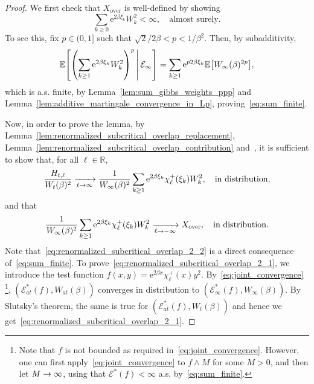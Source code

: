 \documentclass[AHL,Unicode,longabstracts,published]{cedram}
\newcommand{\rover}{\mathrm{over}}
\newcommand{\e}{\mathrm{e}}
\newcommand{\E}{\mathbb{E}}
\newcommand{\R}{\mathbb{R}}
\newcommand\1{\mathds{1}}
\newcommand{\cE}{\mathcal{E}}
\newcommand{\Expec}[1]{\mathbb{E}\left[#1\right]}
\let\originalleft\left
\let\originalright\right
\renewcommand{\left}{\mathopen{}\mathclose\bgroup\originalleft}
\renewcommand{\right}{\aftergroup\egroup\originalright}
\renewcommand*{\to}{\mathchoice{\longrightarrow}{\rightarrow}{\rightarrow}{\rightarrow}}
\begin{document}
\begin{proof}
We first check that $X_{\rover}$ is well-defined by showing
\begin{equation}\label{eq:sum_finite}
\sum_{k \geq 0} \e^{2 \beta \xi_k} W_k^2 < \infty,
\quad \text{almost surely}.
\end{equation}
To see this, fix $p \in (0,1]$ such that $\sqrt{2}/2\beta < p < 1/\beta^2$. Then, by subadditivity,
\begin{equation*}
\E \left[\left(\sum_{k \geq 1} \e^{2 \beta \xi_k} W_k^2\right)^p \,\middle|\, \cE_\infty \right] = \sum_{k \geq 1} \e^{p2 \beta \xi_k} \Expec{W_\infty(\beta)^{2p}},
\end{equation*}
which is a.s. finite, by Lemma~\ref{lem:sum_gibbs_weights_ppp} and Lemma~\ref{lem:additive_martingale_convergence_in_Lp}, proving~\eqref{eq:sum_finite}.

Now, in order to prove the lemma, by Lemma~\ref{lem:renormalized_subcritical_overlap_replacement}, Lemma~\ref{lem:renormalized_subcritical_overlap_contribution} and~\cite[Theorem~3.2]{Billingsley1999}, it is sufficient to show that, for all $\ell \in \R$,
\begin{equation}\label{eq:renormalized_subcritical_overlap_2_1}
\frac{H_{t, \ell}}{W_t(\beta)^2} \xrightarrow[t \to \infty]{} \frac{1}{W_\infty(\beta)^2} \sum_{k \geq 1} \e^{2 \beta \xi_k} \chi_\ell^+(\xi_k) W_k^2, \quad \text{in distribution},
\end{equation}
and that
\begin{equation}\label{eq:renormalized_subcritical_overlap_2_2}
\frac{1}{W_\infty(\beta)^2} \sum_{k \geq 1} \e^{2 \beta \xi_k} \chi_\ell^+(\xi_k) W_k^2 \xrightarrow[\ell \to -\infty]{} X_{\rover}, \quad \text{in distribution}.
\end{equation}
Note that~\eqref{eq:renormalized_subcritical_overlap_2_2} is a direct consequence of~\eqref{eq:sum_finite}. To prove~\eqref{eq:renormalized_subcritical_overlap_2_1}, we introduce the test function $f(x,y) = \e^{2\beta x} \chi_\ell^+(x) y^2$. By~\eqref{eq:joint_convergence}
\footnote{Note that $f$ is not bounded as required in~\eqref{eq:joint_convergence}. However, one can first apply~\eqref{eq:joint_convergence} to $f \wedge M$ for some $M> 0$, and then let $M \to \infty$, using that $\cE^*(f) < \infty$ a.s. by~\eqref{eq:sum_finite}.}, $(\cE_{at}^*(f), W_{at}(\beta))$ converges in distribution to $(\cE_\infty^*(f), W_\infty(\beta))$. By Slutsky's theorem, the same is true for $(\cE_{at}^*(f), W_t(\beta))$ and hence we get~\eqref{eq:renormalized_subcritical_overlap_2_1}.
\end{proof}
\end{document}
